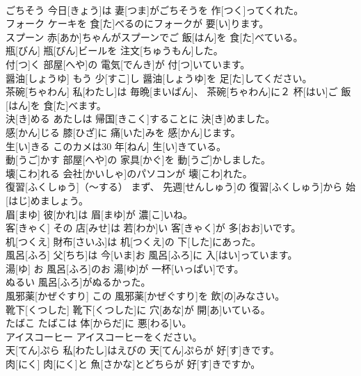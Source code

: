 \documentclass[8pt]{extreport}
\begin{document}
\begin{CJK}{UTF8}{min}
\\	ごちそう	今日[きょう]は 妻[つま]がごちそうを 作[つく]ってくれた。		
\\	フォーク	ケーキを 食[た]べるのにフォークが 要[い]ります。		
\\	スプーン	赤[あか]ちゃんがスプーンでご 飯[はん]を 食[た]べている。		
\\	瓶[びん]	瓶[びん]ビールを 注文[ちゅうもん]した。		
\\	付[つ]く	部屋[へや]の 電気[でんき]が 付[つ]いています。		
\\	醤油[しょうゆ]	もう 少[すこ]し 醤油[しょうゆ]を 足[た]してください。		
\\	茶碗[ちゃわん]	私[わたし]は 毎晩[まいばん]、 茶碗[ちゃわん]に２ 杯[はい]ご 飯[はん]を 食[た]べます。		
\\	決[き]める	あたしは 帰国[きこく]することに 決[き]めました。		
\\	感[かん]じる	膝[ひざ]に 痛[いた]みを 感[かん]じます。		
\\	生[い]きる	このカメは30 年[ねん] 生[い]きている。		
\\	動[うご]かす	部屋[へや]の 家具[かぐ]を 動[うご]かしました。		
\\	壊[こわ]れる	会社[かいしゃ]のパソコンが 壊[こわ]れた。		
\\	復習[ふくしゅう]（～する）	まず、 先週[せんしゅう]の 復習[ふくしゅう]から 始[はじ]めましょう。		
\\	眉[まゆ]	彼[かれ]は 眉[まゆ]が 濃[こ]いね。		
\\	客[きゃく]	その 店[みせ]は 若[わか]い 客[きゃく]が 多[おお]いです。		
\\	机[つくえ]	財布[さいふ]は 机[つくえ]の 下[した]にあった。		
\\	風呂[ふろ]	父[ちち]は 今[いま]お 風呂[ふろ]に 入[はい]っています。		
\\	湯[ゆ]	お 風呂[ふろ]のお 湯[ゆ]が 一杯[いっぱい]です。		
\\	ぬるい	風呂[ふろ]がぬるかった。		
\\	風邪薬[かぜぐすり]	この 風邪薬[かぜぐすり]を 飲[の]みなさい。		
\\	靴下[くつした]	靴下[くつした]に 穴[あな]が 開[あ]いている。		
\\	たばこ	たばこは 体[からだ]に 悪[わる]い。		
\\	アイスコーヒー	アイスコーヒーをください。		
\\	天[てん]ぷら	私[わたし]はえびの 天[てん]ぷらが 好[す]きです。		
\\	肉[にく]	肉[にく]と 魚[さかな]とどちらが 好[す]きですか。		

\end{CJK}
\end{document}
